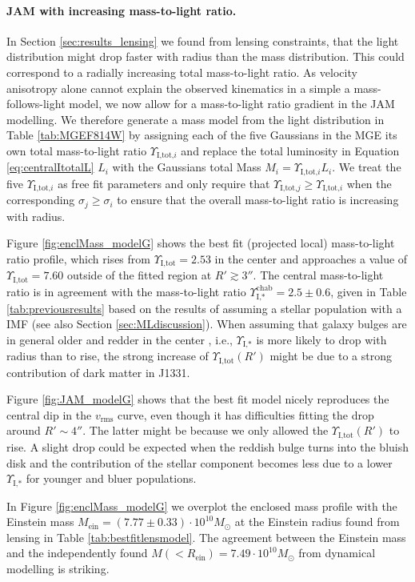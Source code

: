 \paragraph{JAM with increasing mass-to-light ratio.} In Section \ref{sec:results_lensing} we found from lensing constraints, that the light distribution might drop faster with radius than the mass distribution. This could correspond to a radially increasing total mass-to-light ratio. As velocity anisotropy alone cannot explain the observed kinematics in a simple a mass-follows-light model, we now allow for a mass-to-light ratio gradient in the JAM modelling. We therefore generate a mass model from the light distribution in Table \ref{tab:MGEF814W} by assigning each of the five Gaussians in the MGE its own total mass-to-light ratio $\Upsilon_{\text{I,tot,}i}$ and replace the total luminosity in Equation \eqref{eq:centralItotalL} $L_i$ with the Gaussians total Mass $M_i = \Upsilon_{\text{I,tot,}i} L_i$. We treat the five $\Upsilon_{\text{I,tot,}i}$ as free fit parameters and only require that $\Upsilon_{\text{I,tot,}j} \geq \Upsilon_{\text{I,tot,}i}$ when the corresponding $\sigma_j \geq \sigma_i$ to ensure that the overall mass-to-light ratio is increasing with radius.

Figure \ref{fig:enclMass_modelG} shows the best fit (projected local) mass-to-light ratio profile, which rises from $\Upsilon_\text{I,tot} = 2.53$ in the center and approaches a value of $\Upsilon_\text{I,tot} = 7.60$ outside of the fitted region at $R'\gtrsim 3''$. The central mass-to-light ratio is in agreement with the mass-to-light ratio $\Upsilon_\text{I,*}^\text{chab} = 2.5 \pm 0.6$, given in Table \ref{tab:previousresults} based on the results of \citet{SWELLSI} assuming a stellar population with a \citet{Chabrier2003} IMF (see also Section \ref{sec:MLdiscussion}). When assuming that galaxy bulges are in general older and redder in the center \Wilma{[TO DO: REF]}, i.e., $\Upsilon_\text{I,*}$ is more likely to drop with radius than to rise, the strong increase of $\Upsilon_\text{I,tot}(R')$ might be due to a strong contribution of dark matter in J1331.

Figure \ref{fig:JAM_modelG} shows that the best fit model nicely reproduces the central dip in the $v_\text{rms}$ curve, even though it has difficulties fitting the drop around $R' \sim 4''$. The latter might be because we only allowed the $\Upsilon_\text{I,tot}(R')$ to rise. A slight drop could be expected when the reddish bulge turns into the bluish disk and the contribution of the stellar component becomes less due to a lower $\Upsilon_\text{I,*}$ for younger and bluer populations.

In Figure \ref{fig:enclMass_modelG} we overplot the enclosed mass profile with the Einstein mass $M_\text{ein} = (7.77 \pm 0.33) \cdot 10^{10} M_\odot$ at the Einstein radius found from lensing in Table \ref{tab:bestfitlensmodel}. The agreement between the Einstein mass and the independently found $M(<R_\text{ein}) = 7.49 \cdot 10^{10} M_\odot$ from dynamical modelling is striking.
